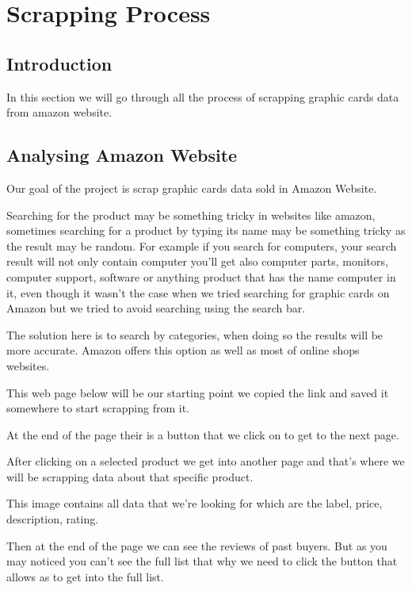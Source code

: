 \section{Scrapping Process}
\subsection{Introduction}
In this section we will go through all the process of scrapping graphic cards data from amazon website.

\subsection{Analysing Amazon Website}
Our goal of the project is scrap graphic cards data sold in Amazon Website.

Searching for the product may be something tricky in websites like amazon, sometimes searching for a product by typing its name may be something tricky as the result may be random.
For example if you search for computers, your search result will not only contain computer you'll get also computer parts, monitors, computer support, software or anything product that has the name computer in it, even though it wasn't the case when we tried searching for graphic cards on Amazon but we tried to avoid searching using the search bar.

The solution here is to search by categories, when doing so the results will be more accurate. Amazon offers this option as well as most of online shops websites.

This web page below will be our starting point we copied the link and saved it somewhere to start scrapping from it.

At the end of the page their is a button that we click on to get to the next page.

After clicking on a selected product we get into another page and that's where we will be scrapping data about that specific product.

This image contains all data that we're looking for which are the label, price, description, rating.

Then at the end of the page we can see the reviews of past buyers. But as you may noticed you can't see the full list that why we need to click the button that allows as to get into the full list.

